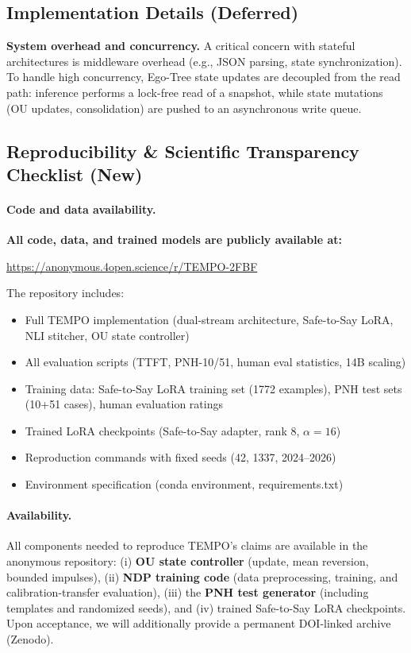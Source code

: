 \documentclass[11pt]{article}
\begin{document}
\subsection{Implementation Details (Deferred)}
\label{app:impl-details}
\textbf{System overhead and concurrency.} A critical concern with stateful architectures is middleware overhead (e.g., JSON parsing, state synchronization). To handle high concurrency, Ego-Tree state updates are decoupled from the read path: inference performs a lock-free read of a snapshot, while state mutations (OU updates, consolidation) are pushed to an asynchronous write queue.

\subsection{Reproducibility \& Scientific Transparency Checklist (New)}
\label{app:repro-checklist}

\paragraph{Code and data availability.}
\textbf{All code, data, and trained models are publicly available at:}

\begin{center}
\url{https://anonymous.4open.science/r/TEMPO-2FBF}
\end{center}

\noindent The repository includes:
\begin{itemize}
  \item Full TEMPO implementation (dual-stream architecture, Safe-to-Say LoRA, NLI stitcher, OU state controller)
  \item All evaluation scripts (TTFT, PNH-10/51, human eval statistics, 14B scaling)
  \item Training data: Safe-to-Say LoRA training set (1772 examples), PNH test sets (10+51 cases), human evaluation ratings
  \item Trained LoRA checkpoints (Safe-to-Say adapter, rank 8, $\alpha{=}16$)
  \item Reproduction commands with fixed seeds (42, 1337, 2024--2026)
  \item Environment specification (conda environment, requirements.txt)
\end{itemize}

\paragraph{Availability.}
All components needed to reproduce TEMPO's claims are available in the anonymous repository:
(i) \textbf{OU state controller} (update, mean reversion, bounded impulses),
(ii) \textbf{NDP training code} (data preprocessing, training, and calibration-transfer evaluation),
(iii) the \textbf{PNH test generator} (including templates and randomized seeds), and
(iv) trained Safe-to-Say LoRA checkpoints.
Upon acceptance, we will additionally provide a permanent DOI-linked archive (Zenodo).
\end{document}
